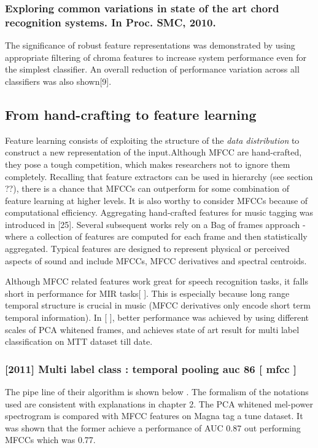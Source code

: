 \subsubsection{Exploring common variations in state of the art chord recognition systems. In Proc. SMC, 2010.}
The significance of robust feature representations was demonstrated by using appropriate filtering of chroma features to increase system performance even for the simplest classifier. An overall reduction of performance variation across all classifiers was also shown[9].

\subsection{From hand-crafting to feature learning}
 
Feature learning consists of exploiting the structure of the \textit{data distribution} to construct a new representation of the input.Although MFCC are hand-crafted, they pose a tough competition, which makes researchers not to ignore them completely. Recalling that feature extractors can be used in hierarchy (see section ??), there is a chance that MFCCs can outperform for some combination of feature learning at higher levels. It is also worthy to consider MFCCs because of computational efficiency. Aggregating hand-crafted features for music tagging was introduced in [25]. Several subsequent works rely on a Bag of frames approach - where a collection of features are computed for each frame and then statistically aggregated. Typical features are designed to represent physical or perceived aspects of sound and include MFCCs, MFCC derivatives and spectral centroids.
\bigskip

\noindent Although MFCC related features work great for speech recognition tasks, it falls short in performance for MIR tasks[ ]. This is especially because long range temporal structure is crucial in music (MFCC derivatives only encode short term temporal information). In [ ], better performance was achieved by using different scales of PCA whitened frames, and achieves state of art result for multi label classification on MTT dataset till date.


\subsubsection{[2011] Multi label class : temporal pooling auc 86  [ mfcc ]}

The pipe line of their algorithm is shown below . The formalism of the notations used are consistent with explanations in chapter 2. The PCA whitened mel-power spectrogram is compared with MFCC features on Magna tag a tune dataset. It was shown that the former achieve a performance of AUC 0.87 out performing MFCCs which was 0.77.  
\bigskip

